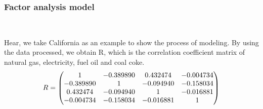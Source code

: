 \documentclass[a4paper,11pt]{article}
\begin{document}
\subsubsection{Factor analysis model}
\textrm{\\}
\par Hear, we take California as an example to show the process of modeling. By using the data processed, we obtain R, which is the correlation coefficient matrix of natural gas, electricity, fuel oil and coal coke.
\begin{equation}
    \centering
R=\begin{pmatrix} 1 & -0.389890 & 0.432474 & -0.004734 \\ -0.389890 & 1 & -0.094940 &-0.158034 \\ 0.432474 & -0.094940 & 1 & -0.016881 \\ -0.004734 & -0.158034 & -0.016881 & 1\end{pmatrix}
\end{equation}
\end{document}
